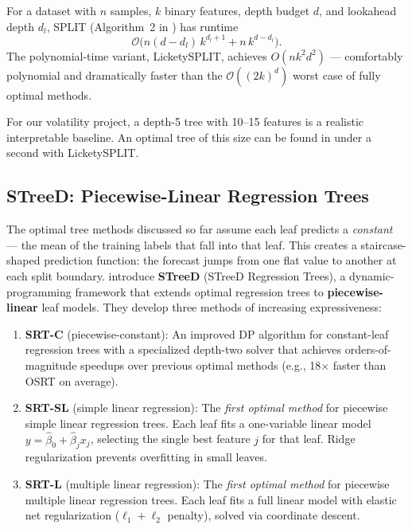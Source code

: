 \begin{keyresult}
For a dataset with $n$ samples, $k$ binary features, depth budget $d$, and
lookahead depth $d_l$, SPLIT (Algorithm~2 in \citet{BabbarEtAl2025}) has
runtime
\[
  \mathcal{O}\bigl(n(d - d_l)\,k^{d_l + 1} + n\,k^{d - d_l}\bigr).
\]
The polynomial-time variant, LicketySPLIT, achieves $O(nk^2 d^2)$ ---
comfortably polynomial and dramatically faster than the $\mathcal{O}((2k)^d)$
worst case of fully optimal methods.
\end{keyresult}

\begin{projectconnection}
For our volatility project, a depth-5 tree with 10--15 features is a
realistic interpretable baseline.  An optimal tree of this size can be found
in under a second with LicketySPLIT.
\end{projectconnection}

\subsection{STreeD: Piecewise-Linear Regression Trees}
\label{sec:rashomon:streed}

The optimal tree methods discussed so far assume each leaf predicts a
\emph{constant} --- the mean of the training labels that fall into that leaf.
This creates a staircase-shaped prediction function: the forecast jumps
from one flat value to another at each split boundary.
\citet{VanDenBosEtAl2024} introduce \textbf{STreeD} (STreeD Regression
Trees), a dynamic-programming framework that extends optimal regression
trees to \textbf{piecewise-linear} leaf models.  They develop three methods
of increasing expressiveness:

\begin{enumerate}[leftmargin=1.8em]
  \item \textbf{SRT-C} (piecewise-constant): An improved DP algorithm for
    constant-leaf regression trees with a specialized depth-two solver that
    achieves orders-of-magnitude speedups over previous optimal methods
    (e.g., 18$\times$ faster than OSRT on average).

  \item \textbf{SRT-SL} (simple linear regression): The \emph{first optimal
    method} for piecewise simple linear regression trees.  Each leaf fits a
    one-variable linear model $y = \hat{\beta}_0 + \hat{\beta}_j x_j$,
    selecting the single best feature $j$ for that leaf.  Ridge
    regularization prevents overfitting in small leaves.

  \item \textbf{SRT-L} (multiple linear regression): The \emph{first optimal
    method} for piecewise multiple linear regression trees.  Each leaf fits
    a full linear model with elastic net regularization ($\ell_1 + \ell_2$
    penalty), solved via coordinate descent.
\end{enumerate}

